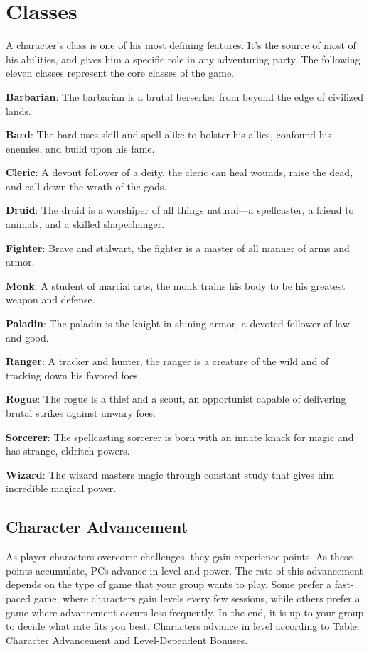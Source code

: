 		
\chapter{Classes}
A character's class is one of his most defining features. It's the source of most of his 
abilities, and gives him a specific role in any adventuring party. The following eleven classes represent the core classes of the game.

\label{f0}				
\textbf{Barbarian}: The barbarian is a brutal berserker from beyond the edge of civilized lands.
				
\textbf{Bard}: The bard uses skill and spell alike to bolster his allies, confound his enemies, and build upon his fame.
				
\textbf{Cleric}: A devout follower of a deity, the cleric can heal wounds, raise the dead, and call down the wrath of the gods.
				
\textbf{Druid}: The druid is a worshiper of all things natural---a spellcaster, a friend to animals, and a skilled shapechanger.
				
\textbf{Fighter}: Brave and stalwart, the fighter is a master of all manner of arms and armor.
				
\textbf{Monk}: A student of martial arts, the monk trains his body to be his greatest weapon and defense.
				
\textbf{Paladin}: The paladin is the knight in shining armor, a devoted follower of law and good.
				
\textbf{Ranger}: A tracker and hunter, the ranger is a creature of the wild and of tracking down his favored foes.
				
\textbf{Rogue}: The rogue is a thief and a scout, an opportunist capable of delivering brutal strikes against unwary foes.
				
\textbf{Sorcerer}: The spellcasting sorcerer is born with an innate knack for magic and has strange, eldritch powers.
				
\textbf{Wizard}: The wizard masters magic through constant study that gives him incredible magical power.
				
\section{Character Advancement}

				
As player characters overcome challenges, they gain experience points. As these points accumulate, PCs advance in level and power. The rate of this advancement depends on the type of game that your group wants to play. Some prefer a fast-paced game, where characters gain levels every few sessions, while others prefer a game where advancement occurs less frequently. In the end, it is up to your group to decide what rate fits you best. Characters advance in level according to Table: Character Advancement and Level-Dependent Bonuses.
				
